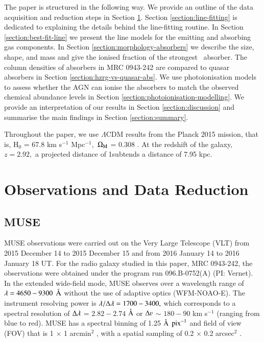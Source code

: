 The paper is structured in the following way. We provide an outline of the data acquisition and reduction steps in Section \ref{section:observations}. Section \ref{section:line-fitting} is dedicated to explaining the details behind the line-fitting routine. In Section \ref{section:best-fit-line} we present the line models for the emitting and absorbing gas components. In Section \ref{section:morphology-absorbers} we describe the size, shape, and mass and give the ionised fraction of the strongest \lya~absorber. The column densities of absorbers in MRC 0943-242 are compared to quasar absorbers in Section \ref{section:hzrg-vs-quasar-abs}. We use photoionisation models to assess whether the AGN can ionise the absorbers to match the observed chemical abundance levels in Section \ref{section:photoionisation-modelling}. We provide an interpretation of our results in Section \ref{section:discussion} and summarise the main findings in Section \ref{section:summary}. 

Throughout the paper, we use $\Lambda$CDM results from the Planck 2015 mission, that is, H$_0$ = 67.8 km s$^{-1}$ Mpc$^{-1},$ $\Omega_{\rm M}$ = 0.308 \citep{Planck2016}. At the redshift of the galaxy, $z = 2.92,$ a projected distance of 1\arcsec subtends a distance of 7.95 kpc. 

\section{Observations and Data Reduction}\label{section:observations}
\subsection{MUSE}
MUSE observations were carried out on the Very Large Telescope (VLT) from 2015 December 14 to 2015 December 15 and from 2016 January 14 to 2016 January 18 UT. For the radio galaxy studied in this paper, MRC 0943-242, the observations were obtained under the program run 096.B-0752(A) (PI: Vernet). In the extended wide-field mode, MUSE observes over a wavelength range of $\lambda = 4650 - 9300$ $\mbox{\normalfont\AA }$ without the use of adaptive optics (WFM-NOAO-E). The instrument resolving power is $\lambda/\Delta \lambda = 1700 - 3400,$ which corresponds to a spectral resolution of $\Delta \lambda$ = $2.82 - 2.74$ $\mbox{\normalfont\AA }$ or $\Delta \varv$ $\sim$ $180 - 90$ km s$^{-1}$ (ranging from blue to red). MUSE has a spectral binning of 1.25 $\mbox{\normalfont\AA }$ ${\rm pix}^{-1}$ and field of view (FOV) that is 1 $\times$ 1 arcmin$^2$ , with a spatial sampling of 0.2 $\times$ 0.2 arcsec$^2$ \citep{bacon2012}. 

